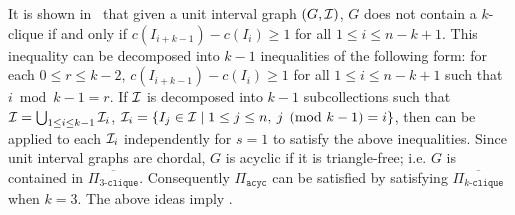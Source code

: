 It is shown in~\cite{HonoratoDroguett2024} that given a unit interval graph $(G,\mathcal{I})$, $G$ does not contain a $k$-clique if and only if $c(I_{i+k-1}) - c(I_i) \ge  1$ for all $1 \le i \le n-k+1$.
%
%
%
%
This inequality can be decomposed into $k-1$ inequalities of the following form:
    for each $0\le r \le k-2$, $c(I_{i+k-1}) - c(I_i) \ge 1$ for all $1\le i \le n-k+1$ such that $i\bmod{k-1} = r$.
If $\mathcal{I}$ is decomposed into $k-1$ subcollections such that $\mathcal{I} = \bigcup_{1\le i \le k-1} \mathcal{I}_i$, $\mathcal{I}_i = \{I_j \in \mathcal{I}\mid 1\le j \le n,\: j\pmod{k-1}=i\}$, then  can be applied to each $\mathcal{I}_i$ independently for $s = 1$ to satisfy the above inequalities.
Since unit interval graphs are chordal, $G$ is acyclic if it is triangle-free; i.e. $G$ is contained in $\overline{\Pi_{3\texttt{-clique}}}$.
Consequently $\Pi_{\texttt{acyc}}$ can be satisfied by satisfying $\overline{\Pi_{k\texttt{-clique}}}$ when $k = 3$.
The above ideas imply .

